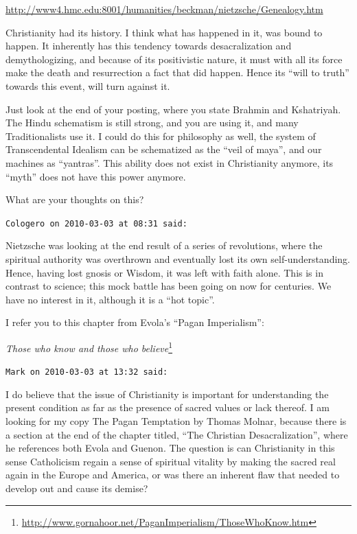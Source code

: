 \begin{footnotesize}
\begin{sffamily}
\url{http://www4.hmc.edu:8001/humanities/beckman/nietzsche/Genealogy.htm}


Christianity had its history. I think what has happened in it, was bound to happen. It inherently has this tendency towards desacralization and demythologizing, and because of its positivistic nature, it must with all its force make the death and resurrection a fact that did happen. Hence its ``will to truth'' towards this event, will turn against it.

Just look at the end of your posting, where you state Brahmin and Kshatriyah. The Hindu schematism is still strong, and you are using it, and many Traditionalists use it. I could do this for philosophy as well, the system of Transcendental Idealism can be schematized as the ``veil of maya'', and our machines as ``yantras''. This ability does not exist in Christianity anymore, its ``myth'' does not have this power anymore.

What are your thoughts on this?

\hfill

\texttt{Cologero on 2010-03-03 at 08:31 said:}

Nietzsche was looking at the end result of a series of revolutions, where the spiritual authority was overthrown and eventually lost its own self-understanding. Hence, having lost gnosis or Wisdom, it was left with faith alone. This is in contrast to science; this mock battle has been going on now for centuries. We have no interest in it, although it is a ``hot topic''.

I refer you to this chapter from Evola's ``Pagan Imperialism'':

\textit{Those who know and those who believe}\footnote{\url{http://www.gornahoor.net/PaganImperialism/ThoseWhoKnow.htm}}

\hfill

\texttt{Mark on 2010-03-03 at 13:32 said:}

I do believe that the issue of Christianity is important for understanding the present condition as far as the presence of sacred values or lack thereof. I am looking for my copy The Pagan Temptation by Thomas Molnar, because there is a section at the end of the chapter titled, ``The Christian Desacralization'', where he references both Evola and Guenon. The question is can Christianity in this sense Catholicism regain a sense of spiritual vitality by making the sacred real again in the Europe and America, or was there an inherent flaw that needed to develop out and cause its demise?


\end{sffamily}
\end{footnotesize}
